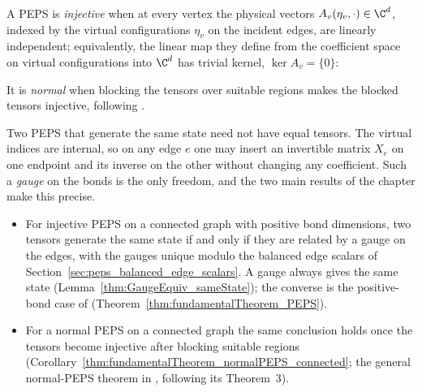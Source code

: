 A PEPS is \emph{injective} when at every vertex the physical vectors
$A_v(\eta_v,\cdot)\in\C^d$, indexed by the virtual configurations $\eta_v$ on
the incident edges, are linearly independent; equivalently, the linear map they
define from the coefficient space on virtual configurations into $\C^d$ has
trivial kernel, $\ker A_v=\{0\}$:
\begin{center}
    \tenkzkernel
    \begin{tenkz}[rows={wire}, cols=1, bonds=none]
    \end{tenkz}
\end{center}
It is \emph{normal} when blocking the tensors over suitable regions makes the
blocked tensors injective, following
\cite[Section~4, lines~1316--1318]{Molnar2018NormalPEPS}.

Two PEPS that generate the same state need not have equal tensors. The virtual
indices are internal, so on any edge $e$ one may insert an invertible matrix
$X_e$ on one endpoint and its inverse on the other without changing any
coefficient. Such a \emph{gauge} on the bonds is the only freedom, and the two
main results of the chapter make this precise.
\begin{itemize}
    \item For injective PEPS on a connected graph with positive bond
          dimensions, two tensors generate the same state if and only if they are
          related by a gauge on the edges, with the gauges unique modulo the
          balanced edge scalars of Section~\ref{sec:peps_balanced_edge_scalars}.
          A gauge always gives the same state
          (Lemma~\ref{thm:GaugeEquiv_sameState}); the converse is the
          positive-bond case of \cite[Theorem~2]{Molnar2018NormalPEPS}
          (Theorem~\ref{thm:fundamentalTheorem_PEPS}).
    \item For a normal PEPS on a connected graph the same conclusion holds once
          the tensors become injective after blocking suitable regions
          (Corollary~\ref{thm:fundamentalTheorem_normalPEPS_connected}; the general
          normal-PEPS theorem in \cite[Section~4]{Molnar2018NormalPEPS}, following
          its Theorem~3).
\end{itemize}


